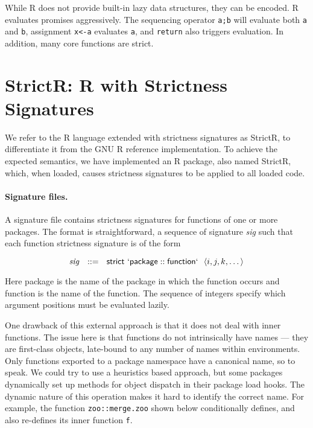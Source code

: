 \documentclass[review,nonacm,screen,acmsmall,anonymous=true]{acmart}
\newcommand{\authorcomment}[3]{}
\newcommand{\OF}[1]{\authorcomment{magenta}{OF}{#1}}
\newcommand{\code}[1]{\lstinline |#1|\xspace}
\newcommand{\strictr}{{\sf StrictR}\xspace}
\begin{document}
\noindent
While R does not provide built-in lazy data structures, they can be encoded. R
evaluates promises aggressively. The sequencing operator \code{a;b} will
evaluate both \code a and \code b, assignment \code{x<-a} evaluates \code a, and
\code{return} also triggers evaluation. In addition, many core functions are
strict.


\section{StrictR: R with Strictness Signatures}\label{sec:strictr}

We refer to the R language extended with strictness signatures as \strictr, to
differentiate it from the GNU R reference implementation. To achieve the
expected semantics, we have implemented an R package, also named \strictr,
which, when loaded, causes strictness signatures to be applied to all loaded
code.

\paragraph{Signature files.}
A signature file contains strictness signatures for functions of one or more
packages. The format is straightforward, a sequence of signature \emph{sig}
such that each function strictness signature is of the form

\[
\mathit{sig}~~::=~~\mathsf{strict}~\mathsf{`package}::\mathsf{function`}~~\langle i, j, k, \dots\rangle
\]

Here {\sf package} is the name of the package in which the function occurs and
{\sf function} is the name of the function. The sequence of integers specify
which argument positions must be evaluated lazily.

One drawback of this external approach is that it does not deal with inner
functions. The issue here is that functions do not intrinsically have names ---
they are first-class objects, late-bound to any number of names within environments.
Only functions exported to a package namespace have a canonical name, so to
speak. \OF{Is it a correct representation that StrictR can only annotate
functions in package namespaces?}
We could try to use a heuristics based approach, but some packages dynamically set up
methods for object dispatch in their package load hooks. The dynamic nature of
this operation makes it hard to identify the correct name.
For example, the function \code{zoo::merge.zoo} shown below
conditionally defines, and also re-defines its inner function \code{f}.
\end{document}

